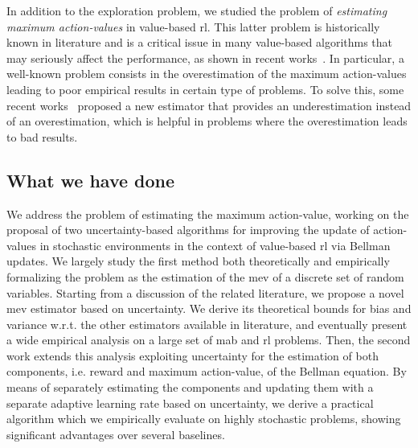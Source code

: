In addition to the exploration problem, we studied the problem of \textit{estimating maximum action-values} in value-based \gls{rl}. This latter problem is historically known in literature and is a critical issue in many value-based algorithms that may seriously affect the performance, as shown in recent works~\cite{smith2006optimizer}. In particular, a well-known problem consists in the overestimation of the maximum action-values leading to poor empirical results in certain type of problems. To solve this, some recent works~\cite{van2010double, xu2013mab, van2015deep} proposed a new estimator that provides an underestimation instead of an overestimation, which is helpful in problems where the overestimation leads to bad results.

\subsection{What we have done}
We address the problem of estimating the maximum action-value, working on the proposal of two uncertainty-based algorithms for improving the update of action-values in stochastic environments in the context of value-based \gls{rl} via Bellman updates. We largely study the first method both theoretically and empirically formalizing the problem as the estimation of the \gls{mev} of a discrete set of random variables. Starting from a discussion of the related literature, we propose a novel \gls{mev} estimator based on uncertainty. We derive its theoretical bounds for bias and variance w.r.t. the other estimators available in literature, and eventually present a wide empirical analysis on a large set of \gls{mab} and \gls{rl} problems. Then, the second work extends this analysis exploiting uncertainty for the estimation of both components, i.e. reward and maximum action-value, of the Bellman equation. By means of separately estimating the components and updating them with a separate adaptive learning rate based on uncertainty, we derive a practical algorithm which we empirically evaluate on highly stochastic problems, showing significant advantages over several baselines.

